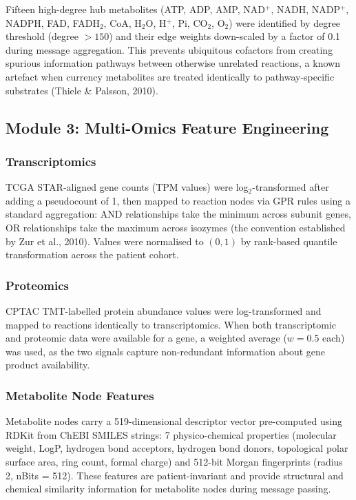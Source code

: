 \documentclass[12pt,a4paper]{article}
\begin{document}
Fifteen high-degree hub metabolites (ATP, ADP, AMP, NAD$^+$, NADH, NADP$^+$, NADPH, FAD, FADH$_2$, CoA, H$_2$O, H$^+$, Pi, CO$_2$, O$_2$) were identified by degree threshold (degree $> 150$) and their edge weights down-scaled by a factor of 0.1 during message aggregation. This prevents ubiquitous cofactors from creating spurious information pathways between otherwise unrelated reactions, a known artefact when currency metabolites are treated identically to pathway-specific substrates (Thiele \& Palsson, 2010).

\subsection{Module 3: Multi-Omics Feature Engineering}

\subsubsection{Transcriptomics}

TCGA STAR-aligned gene counts (TPM values) were log$_2$-transformed after adding a pseudocount of 1, then mapped to reaction nodes via GPR rules using a standard aggregation: AND relationships take the minimum across subunit genes, OR relationships take the maximum across isozymes (the convention established by Zur et al., 2010). Values were normalised to $(0, 1)$ by rank-based quantile transformation across the patient cohort.

\subsubsection{Proteomics}

CPTAC TMT-labelled protein abundance values were log-transformed and mapped to reactions identically to transcriptomics. When both transcriptomic and proteomic data were available for a gene, a weighted average ($w = 0.5$ each) was used, as the two signals capture non-redundant information about gene product availability.

\subsubsection{Metabolite Node Features}

Metabolite nodes carry a 519-dimensional descriptor vector pre-computed using RDKit from ChEBI SMILES strings: 7 physico-chemical properties (molecular weight, LogP, hydrogen bond acceptors, hydrogen bond donors, topological polar surface area, ring count, formal charge) and 512-bit Morgan fingerprints (radius 2, nBits = 512). These features are patient-invariant and provide structural and chemical similarity information for metabolite nodes during message passing.
\end{document}
